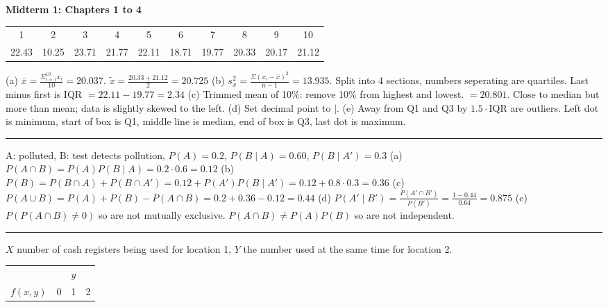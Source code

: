 \documentclass[9pt]{article}
\newcommand*\mean[1]{\bar{#1}}
\newcommand*\median[1]{\tilde{#1}}
\begin{document}
\noindent\textbf{Midterm 1: Chapters 1 to 4}
\addtolength{\tabcolsep}{-2pt}
\begin{multicols*}{2}
    \noindent\begin{tabular*}{0.5\textwidth}{c c c c c c c c c c}
        \hline
        1 & 2 & 3 & 4 & 5 & 6 & 7 & 8 & 9 & 10\\
        22.43 & 10.25 & 23.71 & 21.77 & 22.11 & 18.71 & 19.77 & 20.33 & 20.17 & 21.12\\
        \hline
    \end{tabular*}
    (a) $\mean{x}=\frac{\Sigma_{i=1}^{10}x_i}{10} = 20.037$. 
    $\median{x}=\frac{20.33 + 21.12}{2} = 20.725$\newline
    (b) $s_{x}^{2}=\frac{\Sigma(x_i-\mean{x})^2}{n-1} = 13.935$. 
    Split into 4 sections, numbers seperating are quartiles. 
    Last minus first is IQR $=22.11-19.77 = 2.34$\newline
    (c) Trimmed mean of 10\%: remove 10\% from highest and lowest. $= 20.801$.
    Close to median but more than mean; data is slightly skewed to the left.\newline
    (d) Set decimal point to $\mid$.\newline
    (e) Away from Q1 and Q3 by $1.5\cdot$IQR are outliers. Left dot is minimum, start of
    box is Q1, middle line is median, end of box is Q3, last dot is maximum.
    \rule{0.5\textwidth}{0.4pt}
    \noindent A: polluted, B: test detects pollution, $P(A)=0.2$, $P(B\mid A)=0.60$, 
    $P(B\mid A')=0.3$\newline
    (a) $P(A\cap B)=P(A)P(B\mid A) = 0.2\cdot 0.6=0.12$\newline
    (b) $P(B) = P(B\cap A) + P(B\cap A') = 0.12 + P(A')P(B\mid A') = 0.12 + 0.8 
    \cdot 0.3 = 0.36$\newline
    (c) $P(A\cup B) = P(A)+P(B) - P(A\cap B) = 0.2 + 0.36 - 0.12 = 0.44$\newline
    (d) $P(A'\mid B')=\frac{P(A'\cap B')}{P(B')} = \frac{1 - 0.44}{0.64} = 0.875$
    (e) $P(P(A\cap B) \not= 0)$ so are not mutually exclusive.
    $P(A\cap B) \not= P(A)P(B)$ so are not independent.
    \rule{0.5\textwidth}{0.4pt}
    \noindent $X$ number of cash registers being used for location 1, 
    $Y$ the number used at the same time for location 2.
    \begin{wraptable}{l}{3.7cm}
        \begin{tabular}{c | c | c c c}
            \multicolumn{2}{c|}{} & \multicolumn{3}{c}{$y$}\\
            \multicolumn{2}{c|}{$f(x,y)$} & 0 & 1 & 2\\

\end{tabular}
\end{wraptable}
\end{multicols*}
\end{document}
